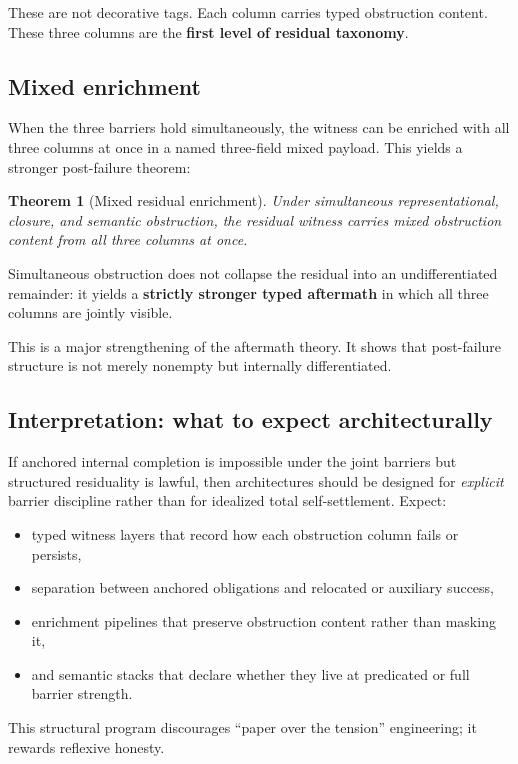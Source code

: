 \documentclass[11pt]{article}
\theoremstyle{plain}
\newtheorem{theorem}{Theorem}[section]
\theoremstyle{definition}
\theoremstyle{remark}
\begin{document}
These are not decorative tags. Each column carries typed obstruction content. These three columns are the \textbf{first level of residual taxonomy}.

\subsection{Mixed enrichment}

When the three barriers hold simultaneously, the witness can be enriched with all three columns at once in a named three-field mixed payload. This yields a stronger post-failure theorem:

\begin{theorem}[Mixed residual enrichment]
Under simultaneous representational, closure, and semantic obstruction, the residual witness carries mixed obstruction content from all three columns at once.
\end{theorem}

Simultaneous obstruction does not collapse the residual into an undifferentiated remainder: it yields a \textbf{strictly stronger typed aftermath} in which all three columns are jointly visible.

This is a major strengthening of the aftermath theory. It shows that post-failure structure is not merely nonempty but internally differentiated.

\subsection{Interpretation: what to expect architecturally}

If anchored internal completion is impossible under the joint barriers but structured residuality is lawful, then architectures should be designed for \emph{explicit} barrier discipline rather than for idealized total self-settlement. Expect:
\begin{itemize}[leftmargin=1.5em]
\item typed witness layers that record how each obstruction column fails or persists,
\item separation between anchored obligations and relocated or auxiliary success,
\item enrichment pipelines that preserve obstruction content rather than masking it,
\item and semantic stacks that declare whether they live at predicated or full barrier strength.
\end{itemize}
This structural program discourages ``paper over the tension'' engineering; it rewards reflexive honesty.
\end{document}
